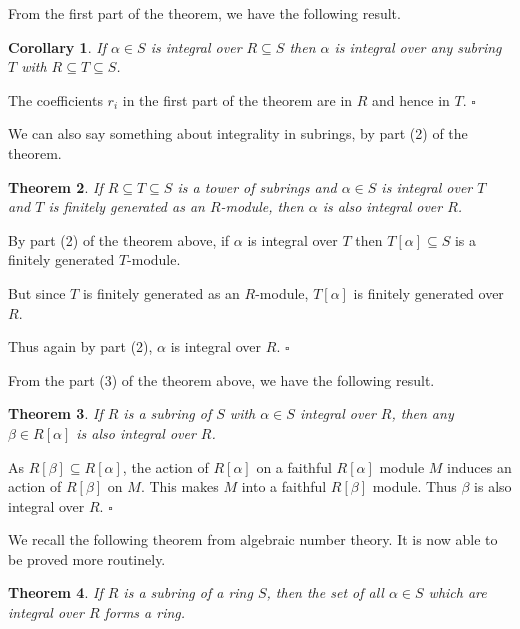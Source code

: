 \documentclass[10pt]{article}
\newcommand{\qed}{\square}
\newtheorem{theorem}{Theorem}[section]
\newtheorem{corollary}[theorem]{Corollary}
\newenvironment{proof}[1][Proof]{\begin{trivlist}
\item[\hskip \labelsep {\bfseries #1}]}{\end{trivlist}}
\begin{document}
From the first part of the theorem, we have the following result.

\begin{corollary}
If $\alpha \in S$ is integral over $R \subseteq S$ then $\alpha$ is integral over any subring $T$ with $R \subseteq T \subseteq S$.
\end{corollary}

\begin{proof}
The coefficients $r_i$ in the first part of the theorem are in $R$ and hence in $T$. $\qed$
\end{proof}

We can also say something about integrality in subrings, by part (2) of the theorem.

\begin{theorem}
If $R \subseteq T \subseteq S$ is a tower of subrings and $\alpha \in S$ is integral over $T$ and $T$ is finitely generated as an $R$-module, then $\alpha$ is also integral over $R$.
\end{theorem}

\begin{proof}
By part (2) of the theorem above, if $\alpha$ is integral over $T$ then $T[\alpha] \subseteq S$ is a finitely generated $T$-module.

But since $T$ is finitely generated as an $R$-module, $T[\alpha]$ is finitely generated over $R$.

Thus again by part (2), $\alpha$ is integral over $R$. $\qed$
\end{proof}

From the part (3) of the theorem above, we have the following result.

\begin{theorem}
If $R$ is a subring of $S$ with $\alpha \in S$ integral over $R$, then any $\beta \in R[\alpha]$ is also integral over $R$.
\end{theorem}

\begin{proof}
As $R[\beta] \subseteq R[\alpha]$, the action of $R[\alpha]$ on a faithful $R[\alpha]$ module $M$ induces an action of $R[\beta]$ on $M$. This makes $M$ into a faithful $R[\beta]$ module. Thus $\beta$ is also integral over $R$. $\qed$
\end{proof}

We recall the following theorem from algebraic number theory. It is now able to be proved more routinely.

\begin{theorem}
If $R$ is a subring of a ring $S$, then the set of all $\alpha \in S$ which are integral over $R$ forms a ring.
\end{theorem}
\end{document}
